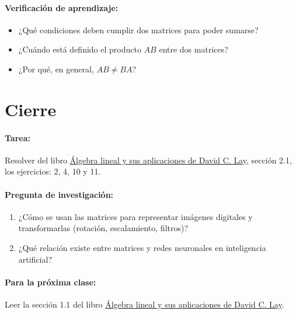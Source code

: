 \documentclass[a4,11pt]{aleph-notas}
\begin{document}
\paragraph{Verificación de aprendizaje:}  
\begin{itemize}[leftmargin=*]  
    \item ¿Qué condiciones deben cumplir dos matrices para poder sumarse?  
    \item ¿Cuándo está definido el producto $AB$ entre dos matrices?  
    \item ¿Por qué, en general, $AB \neq BA$?  
\end{itemize}  

\section*{Cierre}  

\paragraph{Tarea:}  
Resolver del libro \href{https://catalogobiblioteca.puce.edu.ec/cgi-bin/koha/opac-detail.pl?biblionumber=86083&query_desc=kw%2Cwrdl%3A%20%C3%81lgebra%20lineal%20y%20sus%20aplicaciones}{Álgebra lineal y sus aplicaciones de David C. Lay}, sección 2.1, los ejercicios: 2, 4, 10 y 11.

\paragraph{Pregunta de investigación:}  
\begin{enumerate}[leftmargin=*]  
    \item ¿Cómo se usan las matrices para representar imágenes digitales y transformarlas (rotación, escalamiento, filtros)?
    \item ¿Qué relación existe entre matrices y redes neuronales en inteligencia artificial?
\end{enumerate}  

\paragraph{Para la próxima clase:}  
Leer la sección 1.1 del libro \href{https://catalogobiblioteca.puce.edu.ec/cgi-bin/koha/opac-detail.pl?biblionumber=86083&query_desc=kw%2Cwrdl%3A%20%C3%81lgebra%20lineal%20y%20sus%20aplicaciones}{Álgebra lineal y sus aplicaciones de David C. Lay}.
\end{document}
